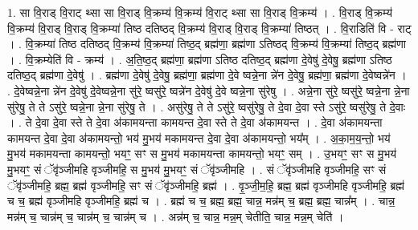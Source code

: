 \documentclass[17pt]{extarticle}
\begin{document}
1. सा वि॒राड् वि॒राट् थ्सा सा वि॒राड् वि॒क्रम्य॑ वि॒क्रम्य॑ वि॒राट् थ्सा सा वि॒राड् वि॒क्रम्य॑ । . वि॒राड् वि॒क्रम्य॑ वि॒क्रम्य॑ वि॒राड् वि॒राड् वि॒क्रम्या॑ तिष्ठ दतिष्ठद् वि॒क्रम्य॑ वि॒राड् वि॒राड् वि॒क्रम्या॑ तिष्ठत् । . वि॒राडिति॑ वि - राट् । . वि॒क्रम्या॑ तिष्ठ दतिष्ठद् वि॒क्रम्य॑ वि॒क्रम्या॑ तिष्ठ॒द् ब्रह्म॑णा॒ ब्रह्म॑णा ऽतिष्ठद् वि॒क्रम्य॑ वि॒क्रम्या॑ तिष्ठ॒द् ब्रह्म॑णा । . वि॒क्रम्येति॑ वि - क्रम्य॑ । . अ॒ति॒ष्ठ॒द् ब्रह्म॑णा॒ ब्रह्म॑णा ऽतिष्ठ दतिष्ठ॒द् ब्रह्म॑णा दे॒वेषु॑ दे॒वेषु॒ ब्रह्म॑णा ऽतिष्ठ दतिष्ठ॒द् ब्रह्म॑णा दे॒वेषु॑ । . ब्रह्म॑णा दे॒वेषु॑ दे॒वेषु॒ ब्रह्म॑णा॒ ब्रह्म॑णा दे॒वे ष्वन्ने॒ना न्ने॑न दे॒वेषु॒ ब्रह्म॑णा॒ ब्रह्म॑णा दे॒वेष्वन्ने॑न । . दे॒वेष्वन्ने॒ना न्ने॑न दे॒वेषु॑ दे॒वेष्वन्ने॒ना सु॑रे॒ ष्वसु॑रे॒ ष्वन्ने॑न दे॒वेषु॑ दे॒वे ष्वन्ने॒ना सु॑रेषु । . अन्ने॒ना सु॑रे॒ ष्वसु॑रे॒ ष्वन्ने॒ना न्ने॒ना सु॑रेषु॒ ते ते ऽसु॑रे॒ ष्वन्ने॒ना न्ने॒ना सु॑रेषु॒ ते । . असु॑रेषु॒ ते ते ऽसु॑रे॒ ष्वसु॑रेषु॒ ते दे॒वा दे॒वा स्ते ऽसु॑रे॒ ष्वसु॑रेषु॒ ते दे॒वाः । . ते दे॒वा दे॒वा स्ते ते दे॒वा अ॑कामयन्ता कामयन्त दे॒वा स्ते ते दे॒वा अ॑कामयन्त । . दे॒वा अ॑कामयन्ता कामयन्त दे॒वा दे॒वा अ॑कामयन्तो॒ भय॑ मु॒भय॑ मकामयन्त दे॒वा दे॒वा अ॑कामयन्तो॒ भय᳚म् । . अ॒का॒म॒य॒न्तो॒ भय॑ मु॒भय॑ मकामयन्ता कामयन्तो॒ भयꣳ॒॒ सꣳ स मु॒भय॑ मकामयन्ता कामयन्तो॒ भयꣳ॒॒ सम् । . उ॒भयꣳ॒॒ सꣳ स मु॒भय॑ मु॒भयꣳ॒॒ सं ॅवृ॑ञ्जीमहि वृञ्जीमहि॒ स मु॒भय॑ मु॒भयꣳ॒॒ सं ॅवृ॑ञ्जीमहि । . सं ॅवृ॑ञ्जीमहि वृञ्जीमहि॒ सꣳ सं ॅवृ॑ञ्जीमहि॒ ब्रह्म॒ ब्रह्म॑ वृञ्जीमहि॒ सꣳ सं ॅवृ॑ञ्जीमहि॒ ब्रह्म॑ । . वृ॒ञ्जी॒म॒हि॒ ब्रह्म॒ ब्रह्म॑ वृञ्जीमहि वृञ्जीमहि॒ ब्रह्म॑ च च॒ ब्रह्म॑ वृञ्जीमहि वृञ्जीमहि॒ ब्रह्म॑ च । . ब्रह्म॑ च च॒ ब्रह्म॒ ब्रह्म॒ चान्न॒ मन्न॑म् च॒ ब्रह्म॒ ब्रह्म॒ चान्न᳚म् । . चान्न॒ मन्न॑म् च॒ चान्न॑म् च॒ चान्न॑म् च॒ चान्न॑म् च । . अन्न॑म् च॒ चान्न॒ मन्न॒म् चेतीति॒ चान्न॒ मन्न॒म् चेति॑ । \newline
\end{document}

